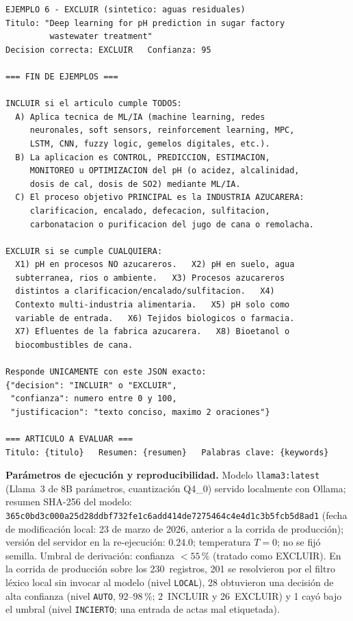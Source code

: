 \begin{lstlisting}[language={},
caption={\textit{Prompt} de producción (seis ejemplos sintéticos) para
clasificación INCLUIR/EXCLUIR. El Ejemplo~3 contiene la fuga descrita en
el texto.},
label={lst:prompt}]
EJEMPLO 6 - EXCLUIR (sintetico: aguas residuales)
Titulo: "Deep learning for pH prediction in sugar factory
         wastewater treatment"
Decision correcta: EXCLUIR   Confianza: 95

=== FIN DE EJEMPLOS ===

INCLUIR si el articulo cumple TODOS:
  A) Aplica tecnica de ML/IA (machine learning, redes
     neuronales, soft sensors, reinforcement learning, MPC,
     LSTM, CNN, fuzzy logic, gemelos digitales, etc.).
  B) La aplicacion es CONTROL, PREDICCION, ESTIMACION,
     MONITOREO u OPTIMIZACION del pH (o acidez, alcalinidad,
     dosis de cal, dosis de SO2) mediante ML/IA.
  C) El proceso objetivo PRINCIPAL es la INDUSTRIA AZUCARERA:
     clarificacion, encalado, defecacion, sulfitacion,
     carbonatacion o purificacion del jugo de cana o remolacha.

EXCLUIR si se cumple CUALQUIERA:
  X1) pH en procesos NO azucareros.   X2) pH en suelo, agua
  subterranea, rios o ambiente.   X3) Procesos azucareros
  distintos a clarificacion/encalado/sulfitacion.   X4)
  Contexto multi-industria alimentaria.   X5) pH solo como
  variable de entrada.   X6) Tejidos biologicos o farmacia.
  X7) Efluentes de la fabrica azucarera.   X8) Bioetanol o
  biocombustibles de cana.

Responde UNICAMENTE con este JSON exacto:
{"decision": "INCLUIR" o "EXCLUIR",
 "confianza": numero entre 0 y 100,
 "justificacion": "texto conciso, maximo 2 oraciones"}

=== ARTICULO A EVALUAR ===
Titulo: {titulo}   Resumen: {resumen}   Palabras clave: {keywords}
\end{lstlisting}

\noindent\textbf{Parámetros de ejecución y reproducibilidad.} Modelo
\texttt{llama3:latest} (Llama~3 de 8B parámetros, cuantización Q4\_0)
servido localmente con Ollama; resumen SHA-256 del modelo:
\texttt{365c0bd3c000a25d28ddbf732fe1c6add414de7275464c4e4d1c3b5fcb5d8ad1}
(fecha de modificación local: 23 de marzo de 2026, anterior a la corrida de producción);
versión del servidor en la re-ejecución: 0.24.0; temperatura $T=0$; no se
fijó semilla. Umbral de derivación: confianza $<55\,\%$ (tratado como
EXCLUIR). En la corrida de producción sobre los 230~registros, 201 se
resolvieron por el filtro léxico local sin invocar al modelo (nivel
\texttt{LOCAL}), 28 obtuvieron una decisión de alta confianza (nivel
\texttt{AUTO}, $92$--$98\,\%$; 2~INCLUIR y 26~EXCLUIR) y 1 cayó bajo el
umbral (nivel \texttt{INCIERTO}; una entrada de actas mal etiquetada).

